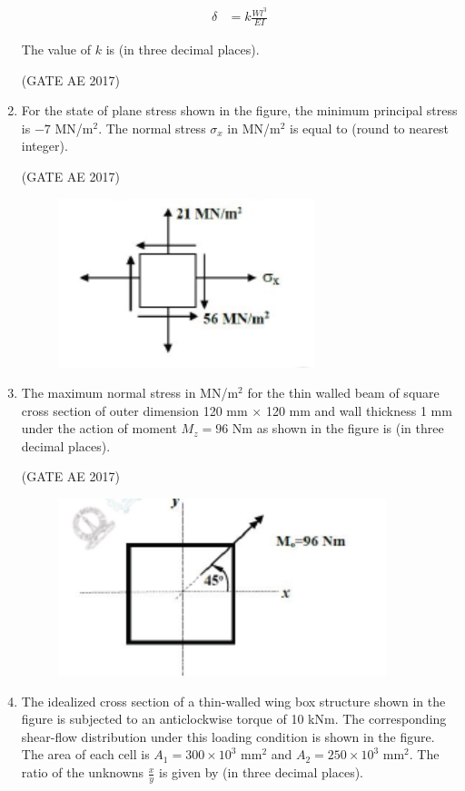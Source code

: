 \documentclass[journal,12pt,onecolumn]{IEEEtran}
\theoremstyle{remark}
\begin{document}
\begin{flushleft}
\begin{enumerate}
\begin{align*}
\delta &= k \frac{W l^3}{EI}
\end{align*}  

The value of $k$ is \underline{\hspace{2cm}} (in three decimal places).  

\hfill (GATE AE 2017)  
\item For the state of plane stress shown in the figure, the minimum principal stress is $-7$ MN/m$^2$. The normal stress $\sigma_x$ in MN/m$^2$ is equal to \underline{\hspace{2cm}} (round to nearest integer).  

\hfill (GATE AE 2017)  

\begin{figure}[H]
    \centering
    \includegraphics[width=0.5\columnwidth]{figs/52.png}
    \caption{}
    \label{fig:placeholder}
\end{figure}
\item The maximum normal stress in MN/m$^2$ for the thin walled beam of square cross section of outer dimension 120 mm $\times$ 120 mm and wall thickness 1 mm under the action of moment $M_z = 96$ Nm as shown in the figure is \underline{\hspace{2cm}} (in three decimal places).  

\hfill (GATE AE 2017)  

\begin{figure}[H]
    \centering
    \includegraphics[width=0.5\columnwidth]{figs/53.png}
    \caption{}
    \label{fig:placeholder}
\end{figure}

\item The idealized cross section of a thin-walled wing box structure shown in the figure is subjected to an anticlockwise torque of 10 kNm. The corresponding shear-flow distribution under this loading condition is shown in the figure. The area of each cell is $A_1 = 300 \times 10^3$ mm$^2$ and $A_2 = 250 \times 10^3$ mm$^2$. The ratio of the unknowns $\tfrac{x}{y}$ is given by \underline{\hspace{2cm}} (in three decimal places).  


\end{enumerate}
\end{flushleft}
\end{document}

